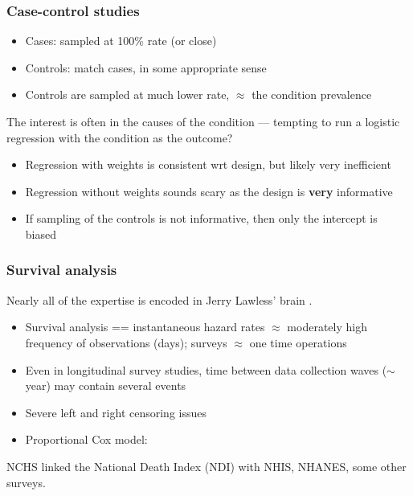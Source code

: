 \documentclass{beamer}
\begin{document}
\begin{frame}\frametitle{Case-control studies}

\begin{itemize}
    \item Cases: sampled at 100\% rate (or close)
    \item Controls: match cases, in some appropriate sense
    \item Controls are sampled at much lower rate, $\approx$ the condition prevalence
\end{itemize}

The interest is often in the causes of the condition --- tempting to run a logistic
regression with the condition as the outcome?

\begin{itemize}
    \item Regression with weights is consistent wrt design, but likely very inefficient
    \item Regression without weights sounds scary as the design is \textbf{very} informative
    \item If sampling of the controls is not informative, then only the intercept is biased
        \citep{scott:wild:2003}
\end{itemize}

\end{frame}

\begin{frame}\frametitle{Survival analysis}

Nearly all of the expertise is encoded in Jerry Lawless' brain
\citep{lawless:2003}.

\begin{itemize}
    \item Survival analysis == instantaneous hazard rates
            $\approx$ moderately high frequency
            of observations (days); surveys $\approx$ one time operations
    \item Even in longitudinal survey studies, time between data collection
          waves ($\sim$year) may contain several events
    \item Severe left and right censoring issues
    \item Proportional Cox model: \citet{binder:1992}
\end{itemize}

NCHS linked the National Death Index (NDI) with NHIS, NHANES,
some other surveys.

\end{frame}
\end{document}
